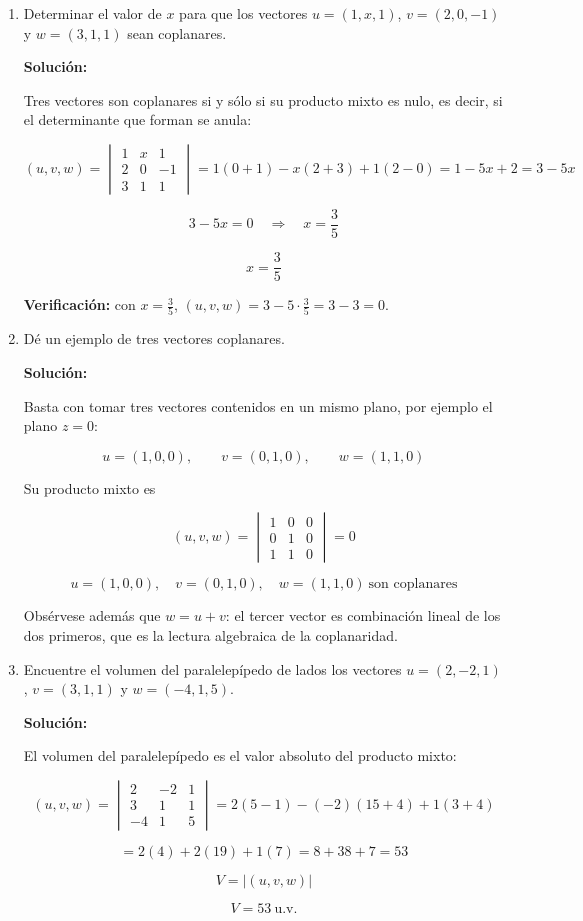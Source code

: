 \documentclass[12pt]{article}
\newcommand{\solucion}{%
    \vspace{0.8em}%
    \textbf{Solución:}%
    \vspace{0.8em}%
}
\begin{document}
\begin{enumerate}[label=\alph*.-]

    \item Determinar el valor de $x$ para que los vectores $u=(1,x,1)$,
    $v=(2,0,-1)$ y $w=(3,1,1)$ sean coplanares.

    \solucion

    Tres vectores son coplanares si y sólo si su producto mixto es nulo, es
    decir, si el determinante que forman se anula:

    \[
    (u,v,w)=\begin{vmatrix}
    1 & x & 1\\
    2 & 0 & -1\\
    3 & 1 & 1
    \end{vmatrix}
    =1(0+1)-x(2+3)+1(2-0)=1-5x+2=3-5x
    \]

    \[
    3-5x=0\quad\Longrightarrow\quad x=\frac{3}{5}
    \]

    \[
    \boxed{x=\frac{3}{5}}
    \]

    \textbf{Verificación:} con $x=\tfrac{3}{5}$,
    $(u,v,w)=3-5\cdot\tfrac{3}{5}=3-3=0$. \checkmark

    \item Dé un ejemplo de tres vectores coplanares.

    \solucion

    Basta con tomar tres vectores contenidos en un mismo plano, por ejemplo
    el plano $z=0$:

    \[
    u=(1,0,0),\qquad v=(0,1,0),\qquad w=(1,1,0)
    \]

    Su producto mixto es

    \[
    (u,v,w)=\begin{vmatrix}
    1 & 0 & 0\\
    0 & 1 & 0\\
    1 & 1 & 0
    \end{vmatrix}=0
    \]

    \[
    \boxed{u=(1,0,0),\quad v=(0,1,0),\quad w=(1,1,0)\ \text{son coplanares}}
    \]

    Obsérvese además que $w=u+v$: el tercer vector es combinación lineal de
    los dos primeros, que es la lectura algebraica de la coplanaridad.

    \item Encuentre el volumen del paralelepípedo de lados los vectores
    $u=(2,-2,1)$, $v=(3,1,1)$ y $w=(-4,1,5)$.

    \solucion

    El volumen del paralelepípedo es el valor absoluto del producto mixto:

    \[
    (u,v,w)=\begin{vmatrix}
    2 & -2 & 1\\
    3 & 1 & 1\\
    -4 & 1 & 5
    \end{vmatrix}
    =2(5-1)-(-2)(15+4)+1(3+4)
    \]

    \[
    =2(4)+2(19)+1(7)=8+38+7=53
    \]

    \[
    V=|(u,v,w)|
    \]

    \[
    \boxed{V=53\ \text{u.v.}}
    \]

\end{enumerate}
\end{document}
